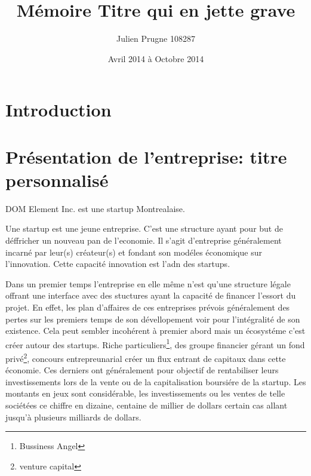 \documentclass[11pt, a4paper ]{article}
\title{Mémoire Titre qui en jette grave}
\author{Julien Prugne 108287}
\date{Avril 2014 à Octobre 2014}
\let\stdsection\section
\renewcommand\section{\newpage\stdsection}
\begin{document}
\begin{spacing}{1.5}

	\maketitle
	\tableofcontents

	
	\section{Introduction} %



	\section{Présentation de l'entreprise: titre personnalisé} %

DOM Element Inc. est une startup Montrealaise.

Une startup\cite{theseStartup} est une jeune entreprise. C'est une structure ayant pour but de déffricher un nouveau pan de l'economie. Il s'agit d'entreprise généralement incarné par leur(s) créateur(s) et fondant son modéles économique sur l'innovation. Cette capacité innovation est l'adn des startups.

Dans un premier temps l'entreprise en elle même n'est qu'une structure légale offrant une interface avec des stuctures ayant la capacité de financer l'essort du projet. En effet, les plan d'affaires de ces entreprises prévois généralement des pertes sur les premiers temps de son dévellopement voir pour l'intégralité de son existence. Cela peut sembler incohérent à premier abord mais un écosystéme c'est créer autour des startups. Riche particuliers\footnote{Bussiness Angel}, des groupe financier gérant un fond privé\footnote{venture capital}, concours entrepreunarial créer un flux entrant de capitaux dans cette économie. Ces derniers ont généralement pour objectif de rentabiliser leurs investissements lors de la vente ou de la capitalisation boursiére de la startup. Les montants en jeux sont considérable, les investissements ou les ventes de telle sociétées ce chiffre en dizaine, centaine de millier de dollars certain cas allant jusqu'à plusieurs milliards de dollars.


\end{spacing}
\end{document}

